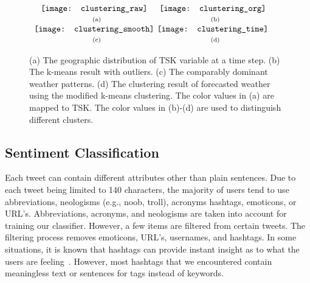 \begin{figure}[t]
\begin{center}
$\begin{array}{c@{\hspace{0.01\linewidth}}c}
\texttt{[image: clustering\_raw]} &
\texttt{[image: clustering\_org]}
\\
\mbox{\small{(a)}} & \mbox{\small{(b)}}
\\
\texttt{[image: clustering\_smooth]} &
\texttt{[image: clustering\_time]}
\\
\mbox{\small{(c)}} & \mbox{\small{(d)}}
\end{array}$
\end{center}
\vspace{-.1in}
\caption{(a) The geographic distribution of TSK variable at a time step. (b) The k-means result with outliers. (c) The comparably dominant weather patterns. (d) The clustering result of forecasted weather using the modified k-means clustering. The color values in (a) are mapped to TSK. The color values in (b)-(d) are used to distinguish different clusters.}
\label{fig:clustering}
\end{figure}

\subsection{Sentiment Classification}
\label{sec:senti}

Each tweet can contain different attributes other than plain sentences. Due to each tweet being limited to 140 characters, the majority of users tend to use abbreviations, neologisms (e.g., noob, troll), acronyms hashtags, emoticons, or URL's. Abbreviations, acronyms, and neologisms are taken into account for training our classifier. However, a few items are filtered from certain tweets. The filtering process removes emoticons, URL's, usernames, and hashtags. In some situations, it is known that hashtags can provide instant insight as to what the users are feeling~\cite{keller2005warm}. However, most hashtags that we encountered contain meaningless text or sentences for tags instead of keywords.

